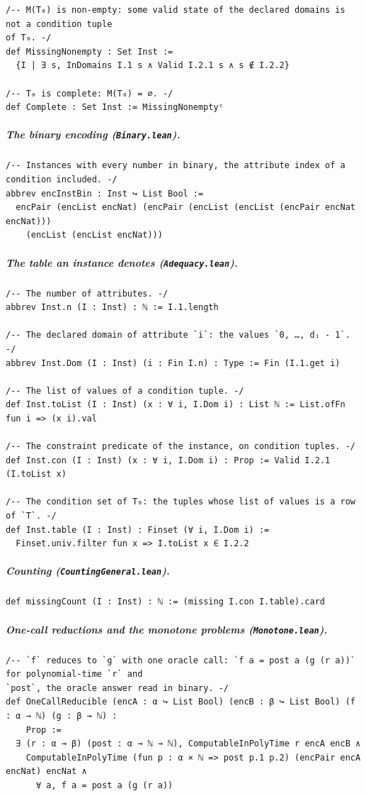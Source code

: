 \documentclass[pdflatex,sn-mathphys-num]{sn-jnl}
\theoremstyle{thmstyleone}
\theoremstyle{thmstylethree}
\begin{document}
\begin{appendices}
\begin{lstlisting}
/-- M(T₀) is non-empty: some valid state of the declared domains is not a condition tuple
of T₀. -/
def MissingNonempty : Set Inst :=
  {I | ∃ s, InDomains I.1 s ∧ Valid I.2.1 s ∧ s ∉ I.2.2}

/-- T₀ is complete: M(T₀) = ∅. -/
def Complete : Set Inst := MissingNonemptyᶜ
\end{lstlisting}

\subparagraph*{The binary encoding (\texttt{Binary.lean}).}
\begin{lstlisting}
/-- Instances with every number in binary, the attribute index of a condition included. -/
abbrev encInstBin : Inst ↪ List Bool :=
  encPair (encList encNat) (encPair (encList (encList (encPair encNat encNat)))
    (encList (encList encNat)))
\end{lstlisting}

\subparagraph*{The table an instance denotes (\texttt{Adequacy.lean}).}
\begin{lstlisting}
/-- The number of attributes. -/
abbrev Inst.n (I : Inst) : ℕ := I.1.length

/-- The declared domain of attribute `i`: the values `0, …, dᵢ - 1`. -/
abbrev Inst.Dom (I : Inst) (i : Fin I.n) : Type := Fin (I.1.get i)

/-- The list of values of a condition tuple. -/
def Inst.toList (I : Inst) (x : ∀ i, I.Dom i) : List ℕ := List.ofFn fun i => (x i).val

/-- The constraint predicate of the instance, on condition tuples. -/
def Inst.con (I : Inst) (x : ∀ i, I.Dom i) : Prop := Valid I.2.1 (I.toList x)

/-- The condition set of T₀: the tuples whose list of values is a row of `T`. -/
def Inst.table (I : Inst) : Finset (∀ i, I.Dom i) :=
  Finset.univ.filter fun x => I.toList x ∈ I.2.2
\end{lstlisting}

\subparagraph*{Counting (\texttt{CountingGeneral.lean}).}
\begin{lstlisting}
def missingCount (I : Inst) : ℕ := (missing I.con I.table).card
\end{lstlisting}

\subparagraph*{One-call reductions and the monotone problems (\texttt{Monotone.lean}).}
\begin{lstlisting}
/-- `f` reduces to `g` with one oracle call: `f a = post a (g (r a))` for polynomial-time `r` and
`post`, the oracle answer read in binary. -/
def OneCallReducible (encA : α ↪ List Bool) (encB : β ↪ List Bool) (f : α → ℕ) (g : β → ℕ) :
    Prop :=
  ∃ (r : α → β) (post : α → ℕ → ℕ), ComputableInPolyTime r encA encB ∧
    ComputableInPolyTime (fun p : α × ℕ => post p.1 p.2) (encPair encA encNat) encNat ∧
      ∀ a, f a = post a (g (r a))


\end{lstlisting}
\end{appendices}
\end{document}
